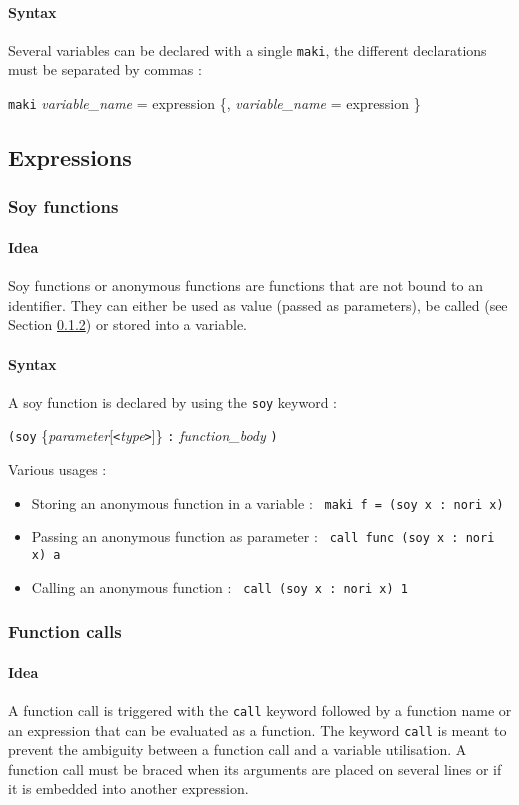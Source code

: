 \documentclass[a4paper,11pt]{article}
\begin{document}
\paragraph{Syntax} Several variables can be declared with a single \texttt{maki}, the different declarations must be separated by commas : 
\begin{center}
\texttt{maki} \textit{variable\_name} = expression \{, \textit{variable\_name} = expression \}
\end{center}
\subsection{Expressions}
\subsubsection{Soy functions}
\paragraph{Idea} Soy functions or anonymous functions are functions that are not bound to an identifier. They can either be used as value (passed as parameters), be called (see Section \ref{sssec:func_call}) or stored into a variable.
\paragraph{Syntax} A soy function is declared by using the \texttt{soy} keyword : 
\begin{center}
	\texttt{(soy} \{\textit{parameter}[\texttt{<}\textit{type}\texttt{>}]\} \texttt{:} \textit{function\_body} \texttt{)}
\end{center}
Various usages :
\begin{itemize}
	\item Storing an anonymous function in a variable : \texttt{ maki f = (soy x : nori x) }
	\item Passing an anonymous function as parameter : \texttt{ call func (soy x : nori x) a }
	\item Calling an anonymous function : \texttt{ call (soy x : nori x) 1 }
\end{itemize}
\label{sssec:soy_func}
\subsubsection{Function calls}
\label{sssec:func_call}
\paragraph{Idea} A function call is triggered with the \texttt{call} keyword followed by a function name or an expression that can be evaluated as a function.  The keyword \texttt{call} is meant to prevent the ambiguity between a function call and a variable utilisation. A function call must be braced when its arguments are placed on several lines or if it is embedded into another expression.
\end{document}

